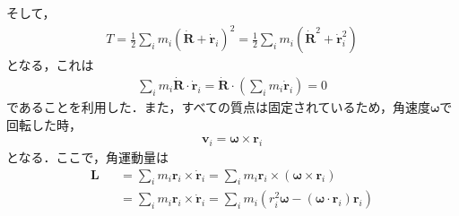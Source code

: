 \documentclass[../Main.tex]{subfiles}
\begin{document}
そして，
\begin{eqnarray}
  T = \frac{1}{2}\sum_i m_i ( \dot{\bm{R}} + \dot{\bm{r}}_i )^2 = \frac{1}{2}\sum_i m_i \left( \dot{\bm{R}}^2 + \dot{\bm{r}}_i^2 \right)
\end{eqnarray}
となる，これは
\begin{eqnarray}
  \sum_i m_i \dot{\bm{R}}\cdot\dot{\bm{r}}_i = \dot{\bm{R}}\cdot \left( \sum_i m_i \dot{\bm{r}}_i \right) =0
\end{eqnarray}
であることを利用した．また，すべての質点は固定されているため，角速度$\bm{\omega}$で回転した時，
\begin{eqnarray}
  \bm{v}_i = \bm{\omega}\times\bm{r}_i
\end{eqnarray}
となる．ここで，角運動量は
\begin{eqnarray}
  \bm{L} &&= \sum_i m_i\bm{r}_i \times \dot{\bm{r}}_i= \sum_i m_i\bm{r}_i \times \left( \bm{\omega}\times\bm{r}_i \right)\\
  &&= \sum_i m_i\bm{r}_i \times \dot{\bm{r}}_i= \sum_i m_i\left( r_i^2 \bm{\omega}-( \bm{\omega}\cdot\bm{r}_i )\bm{r}_i \right)
\end{eqnarray}


\biblio %
\end{document}
